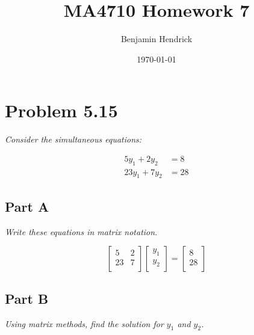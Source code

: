 \documentclass[12pt, letterpaper]{article}
\title{MA4710 Homework 7}
\author{Benjamin Hendrick}
\date{\today}
\begin{document}
\maketitle

\section{Problem 5.15}
\textit{Consider the simultaneous equations:}

\begin{align*}
5y_{1} + 2y_{2} &= 8 \\
23y_{1} + 7y_{2} &= 28
\end{align*}

\subsection{Part A}
\textit{Write these equations in matrix notation.}

$$ \begin{bmatrix}
5 & 2 \\
23 & 7 \\
\end{bmatrix}
\begin{bmatrix}
y_{1} \\
y_{2} \\
\end{bmatrix} =
\begin{bmatrix}
8 \\
28 \\
\end{bmatrix} $$

\subsection{Part B}
\textit{Using matrix methods, find the solution for $y_{1}$ and $y_{2}$.}
\end{document}

